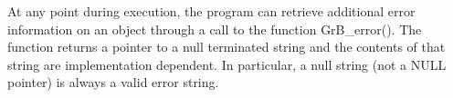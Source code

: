
At any point during execution, the program can retrieve additional
error information on an object through a
call to the function {\sf GrB\_error()}. 
The function returns a pointer to a null terminated string and the contents of that string
are implementation dependent. In particular, a null string (not a {\sf NULL} pointer) is always a valid error string.






%
%
%
%
%
%
%
%
